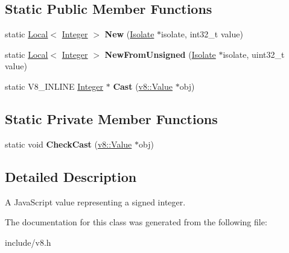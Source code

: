 \subsection*{Static Public Member Functions}
\begin{DoxyCompactItemize}
\item 
static \hyperlink{classv8_1_1_local}{Local}$<$ \hyperlink{classv8_1_1_integer}{Integer} $>$ {\bfseries New} (\hyperlink{classv8_1_1_isolate}{Isolate} $\ast$isolate, int32\+\_\+t value)\hypertarget{classv8_1_1_integer_a730d6e093c16d95edb5b92a4d05773d0}{}\label{classv8_1_1_integer_a730d6e093c16d95edb5b92a4d05773d0}

\item 
static \hyperlink{classv8_1_1_local}{Local}$<$ \hyperlink{classv8_1_1_integer}{Integer} $>$ {\bfseries New\+From\+Unsigned} (\hyperlink{classv8_1_1_isolate}{Isolate} $\ast$isolate, uint32\+\_\+t value)\hypertarget{classv8_1_1_integer_a6fbd6e79db802c737cb0bd5a259f134b}{}\label{classv8_1_1_integer_a6fbd6e79db802c737cb0bd5a259f134b}

\item 
static V8\+\_\+\+I\+N\+L\+I\+NE \hyperlink{classv8_1_1_integer}{Integer} $\ast$ {\bfseries Cast} (\hyperlink{classv8_1_1_value}{v8\+::\+Value} $\ast$obj)\hypertarget{classv8_1_1_integer_a886f73d3d8bb91f8235f66d8dccec12a}{}\label{classv8_1_1_integer_a886f73d3d8bb91f8235f66d8dccec12a}

\end{DoxyCompactItemize}
\subsection*{Static Private Member Functions}
\begin{DoxyCompactItemize}
\item 
static void {\bfseries Check\+Cast} (\hyperlink{classv8_1_1_value}{v8\+::\+Value} $\ast$obj)\hypertarget{classv8_1_1_integer_acc356589ec9cdb5a1dd232ed80e13a74}{}\label{classv8_1_1_integer_acc356589ec9cdb5a1dd232ed80e13a74}

\end{DoxyCompactItemize}


\subsection{Detailed Description}
A Java\+Script value representing a signed integer. 

The documentation for this class was generated from the following file\+:\begin{DoxyCompactItemize}
\item 
include/v8.\+h\end{DoxyCompactItemize}
